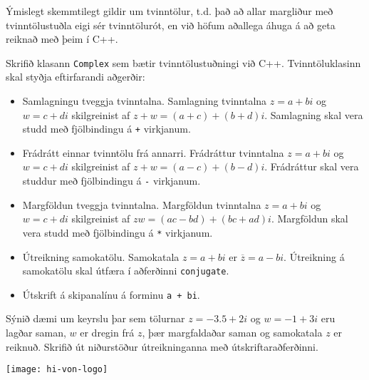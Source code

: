 \documentclass{article}
\begin{document}
Ýmislegt skemmtilegt gildir um tvinntölur, t.d. það að allar margliður með tvinntölustuðla eigi sér tvinntölurót, en við höfum aðallega áhuga á að geta reiknað með þeim í C++.

Skrifið klasann \texttt{Complex} sem bætir tvinntölustuðningi við C++. Tvinntöluklasinn skal styðja eftirfarandi aðgerðir:

\begin{itemize}
 \item Samlagningu tveggja tvinntalna. Samlagning tvinntalna $z = a + bi$ og $w = c + di$ skilgreinist af $z + w = (a+c) + (b+d)i$. Samlagning skal vera studd með fjölbindingu á \texttt{+} virkjanum.
 \item Frádrátt einnar tvinntölu frá annarri. Frádráttur tvinntalna $z = a + bi$ og $w = c + di$ skilgreinist af $z + w = (a-c) + (b-d)i$. Frádráttur skal vera studdur með fjölbindingu á \texttt{-} virkjanum.
 \item Margföldun tveggja tvinntalna. Margföldun tvinntalna $z = a + bi$ og $w = c + di$ skilgreinist af $zw = (ac -bd) + (bc+ad)i$.
 Margföldun skal vera studd með fjölbindingu á \texttt{*} virkjanum.
 \item Útreikning samokatölu. Samokatala $z = a+bi$ er $\overline{z} = a-bi$. Útreikning á samokatölu skal útfæra í aðferðinni \texttt{conjugate}.
 \item Útskrift á skipanalínu á forminu \texttt{a + bi}.
\end{itemize}
Sýnið dæmi um keyrslu þar sem tölurnar $z = -3.5 + 2i$ og $w = -1+3i$ eru lagðar saman, $w$ er dregin frá $z$, þær margfaldaðar saman og samokatala $z$ er reiknuð. Skrifið út niðurstöður útreikninganna með útskriftaraðferðinni.

\vfill
\texttt{[image: hi-von-logo]}
\end{document}
